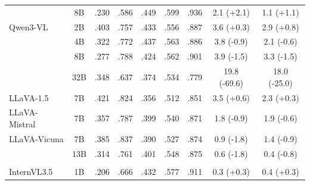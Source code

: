 \begin{table}[t]
\begin{tabular}{>{\raggedright\arraybackslash}p{2.2cm}cccccccc}
 & 8B & \cellcolor[HTML]{F7EBD9}.230 & .586 & \cellcolor[HTML]{D9EAF3}.449 & \cellcolor[HTML]{D9EAF3}.599 & \cellcolor[HTML]{F7EBD9}.936 & \cellcolor{gray!20}2.1 \textcolor[HTML]{D6610A}{(+2.1)} & \cellcolor{gray!20}1.1 \textcolor[HTML]{D6610A}{(+1.1)} \\
\addlinespace[1pt]
Qwen3-VL & 2B & .403 & .757 & \cellcolor[HTML]{D9EAF3}.433 & \cellcolor[HTML]{D9EAF3}.556 & \cellcolor[HTML]{D9EAF3}.887 & \cellcolor{gray!20}3.6 \textcolor[HTML]{D6610A}{(+0.3)} & \cellcolor{gray!20}2.9 \textcolor[HTML]{D6610A}{(+0.8)} \\
 & 4B & .322 & .772 & \cellcolor[HTML]{D9EAF3}.437 & \cellcolor[HTML]{D9EAF3}.563 & \cellcolor[HTML]{D9EAF3}.886 & \cellcolor{gray!20}3.8 \textcolor[HTML]{2166AC}{(-0.9)} & \cellcolor{gray!20}2.1 \textcolor[HTML]{2166AC}{(-0.6)} \\
 & 8B & \cellcolor[HTML]{D9EAF3}.277 & .788 & \cellcolor[HTML]{D9EAF3}.424 & \cellcolor[HTML]{D9EAF3}.562 & \cellcolor[HTML]{D9EAF3}.901 & \cellcolor{gray!20}3.9 \textcolor[HTML]{2166AC}{(-1.5)} & \cellcolor{gray!20}3.3 \textcolor[HTML]{2166AC}{(-1.5)} \\
 & 32B & .348 & .637 & .374 & .534 & .779 & \cellcolor{gray!15}19.8 \textcolor[HTML]{2166AC}{(-69.6)} & \cellcolor{gray!15}18.0 \textcolor[HTML]{2166AC}{(-25.0)} \\
\addlinespace[1pt]
LLaVA-1.5 & 7B & .421 & .824 & .356 & .512 & \cellcolor[HTML]{D9EAF3}.851 & \cellcolor{gray!20}3.5 \textcolor[HTML]{D6610A}{(+0.6)} & \cellcolor{gray!20}2.3 \textcolor[HTML]{D6610A}{(+0.3)} \\
\addlinespace[1pt]
LLaVA-Mistral & 7B & .357 & .787 & \cellcolor[HTML]{D9EAF3}.399 & .540 & \cellcolor[HTML]{D9EAF3}.871 & \cellcolor{gray!20}1.8 \textcolor[HTML]{2166AC}{(-0.9)} & \cellcolor{gray!20}1.9 \textcolor[HTML]{2166AC}{(-0.6)} \\
\addlinespace[1pt]
LLaVA-Vicuna & 7B & .385 & .837 & \cellcolor[HTML]{D9EAF3}.390 & .527 & \cellcolor[HTML]{D9EAF3}.874 & \cellcolor{gray!20}0.9 \textcolor[HTML]{2166AC}{(-1.8)} & \cellcolor{gray!20}1.4 \textcolor[HTML]{2166AC}{(-0.9)} \\
 & 13B & .314 & .761 & \cellcolor[HTML]{D9EAF3}.401 & \cellcolor[HTML]{D9EAF3}.548 & \cellcolor[HTML]{D9EAF3}.875 & \cellcolor{gray!20}0.6 \textcolor[HTML]{2166AC}{(-1.8)} & \cellcolor{gray!20}0.4 \textcolor[HTML]{2166AC}{(-0.8)} \\
\addlinespace[1pt]
\midrule
\multicolumn{9}{c}{\textit{Backbone Decoders}}\\ 
\midrule
InternVL3.5 & 1B & \cellcolor[HTML]{F7EBD9}.206 & .666 & \cellcolor[HTML]{D9EAF3}.432 & \cellcolor[HTML]{D9EAF3}.577 & \cellcolor[HTML]{D9EAF3}.911 & \cellcolor{gray!20}0.3 \textcolor[HTML]{D6610A}{(+0.3)} & \cellcolor{gray!20}0.4 \textcolor[HTML]{D6610A}{(+0.3)} \\

\end{tabular}
\end{table}
